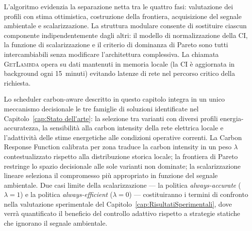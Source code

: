 L'algoritmo evidenzia la separazione netta tra le quattro fasi:
valutazione dei profili con stima ottimistica, costruzione della
frontiera, acquisizione del segnale ambientale e scalarizzazione.
La struttura modulare consente di sostituire ciascun componente
indipendentemente dagli altri: il modello di normalizzazione della CI,
la funzione di scalarizzazione e il criterio di dominanza di Pareto
sono tutti intercambiabili senza modificare l'architettura complessiva.
La chiamata \textsc{GetLambda} opera su dati mantenuti in memoria
locale (la CI è aggiornata in background ogni 15~minuti) evitando
latenze di rete nel percorso critico della richiesta.



\vspace{2em}

Lo scheduler carbon-aware descritto in questo capitolo integra in un
unico meccanismo decisionale le tre famiglie di soluzioni identificate nel
Capitolo~\ref{cap:Stato dell'arte}: la selezione tra varianti con diversi
profili energia-accuratezza, la sensibilità alla carbon intensity della
rete elettrica locale e l'adattività delle stime energetiche alle condizioni
operative correnti. La Carbon Response Function calibrata per zona traduce la carbon
intensity in un peso $\lambda$ contestualizzato rispetto alla
distribuzione storica locale; la frontiera di Pareto restringe lo
spazio decisionale alle sole varianti non dominate; la scalarizzazione
lineare seleziona il compromesso più appropriato in funzione del
segnale ambientale. Due casi limite della scalarizzazione --- la
politica \emph{always-accurate} ($\lambda = 1$) e la politica
\emph{always-efficient} ($\lambda = 0$) --- costituiranno i termini di
confronto nella valutazione sperimentale del
Capitolo~\ref{cap:RisultatiSperimentali}, dove verrà quantificato il
beneficio del controllo adattivo rispetto a strategie statiche che
ignorano il segnale ambientale.
